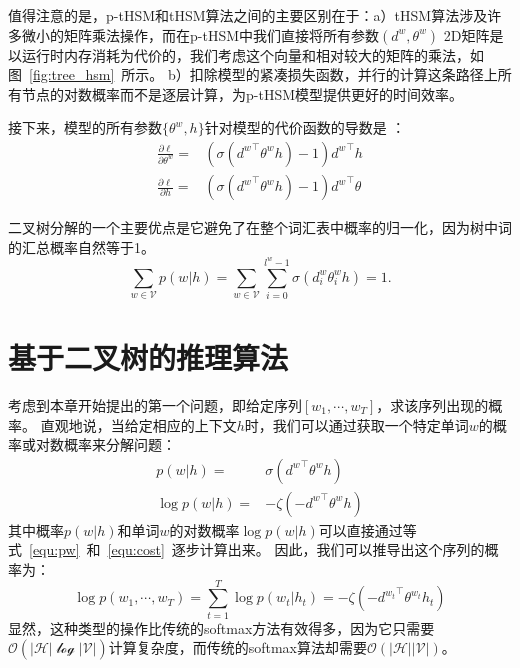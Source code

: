 值得注意的是，p-tHSM和tHSM算法之间的主要区别在于：a）tHSM算法涉及许多微小的矩阵乘法操作，而在p-tHSM中我们直接将所有参数$(d^w,\theta^w)$ 2D矩阵是以运行时内存消耗为代价的，我们考虑这个向量和相对较大的矩阵的乘法，如图~\ref{fig:tree_hsm}~所示。 b）扣除模型的紧凑损失函数，并行的计算这条路径上所有节点的对数概率而不是逐层计算，为p-tHSM模型提供更好的时间效率。

接下来，模型的所有参数$\{\theta^w,h\}$针对模型的代价函数的导数是 ：
\begin{equation}
\begin{split}
\frac{\partial \ell}{\partial \theta^w}=&(\sigma({d^w}^\top\theta^w h) -1){d^w}^\top h \\
\frac{\partial \ell}{\partial h}=&(\sigma({d^w}^\top \theta^w h) -1){d^w}^\top \theta
\end{split}
\end{equation}


二叉树分解的一个主要优点是它避免了在整个词汇表中概率的归一化，因为树中词的汇总概率自然等于1。
\begin{equation}
\sum_{w\in \mathcal{V}}{p(w|h)}=\sum_{w \in \mathcal{V}}\sum_{i=0}^{l^w-1}{\sigma(d_i^w\theta_{i}^w h)}=1.
\end{equation}



\section{基于二叉树的推理算法}
考虑到本章开始提出的第一个问题，即给定序列$ [w_1,\cdots,w_T] $，求该序列出现的概率。 直观地说，当给定相应的上下文$ h $时，我们可以通过获取一个特定单词$ w $的概率或对数概率来分解问题：
\begin{equation}
\begin{split}
    p(w|h) =&\sigma({d^w}^\top \theta^w h)\\
   \log p(w|h) =& -\zeta(- {d^{w}}^\top \theta^{w} h )
\end{split}
\end{equation}
其中概率$ p(w | h)$和单词$ w $的对数概率$ \log p(w | h)$可以直接通过等式~\ref{equ:pw}~和~\ref{equ:cost}~逐步计算出来。 因此，我们可以推导出这个序列的概率为：
\begin{equation}
   \log p(w_1,\cdots, w_T)=\sum_{t=1}^T\log p(w_t|h_t) = -\zeta(- {d^{w_t}}^\top \theta^{w_t} h_t )
\end{equation}
显然，这种类型的操作比传统的softmax方法有效得多，因为它只需要$\mathcal{O}(\mathcal {| H | \log| V |})$计算复杂度，而传统的softmax算法却需要$\mathcal{O}(\mathcal {| H || V |})$。

